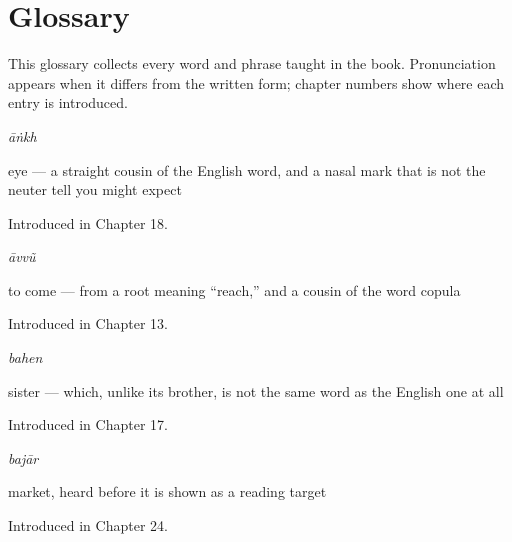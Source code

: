 
\chapter*{Glossary}

This glossary collects every word and phrase taught in the book. Pronunciation appears when it differs from the written form; chapter numbers show where each entry is introduced.

\noindent\begin{minipage}[t]{\linewidth}
\raggedright
\textbf{}\enspace\emph{āṅkh}\par
\small eye — a straight cousin of the English word, and a nasal mark that is not the neuter tell you might expect\par
\footnotesize Introduced in Chapter 18.
\end{minipage}\par\medskip

\noindent\begin{minipage}[t]{\linewidth}
\raggedright
\textbf{}\enspace\emph{āvvũ}\par
\small to come — from a root meaning “reach,” and a cousin of the word copula\par
\footnotesize Introduced in Chapter 13.
\end{minipage}\par\medskip

\noindent\begin{minipage}[t]{\linewidth}
\raggedright
\textbf{}\enspace\emph{bahen}\par
\small sister — which, unlike its brother, is not the same word as the English one at all\par
\footnotesize Introduced in Chapter 17.
\end{minipage}\par\medskip

\noindent\begin{minipage}[t]{\linewidth}
\raggedright
\textbf{}\enspace\emph{bajār}\par
\small market, heard before it is shown as a reading target\par
\footnotesize Introduced in Chapter 24.
\end{minipage}\par\medskip

